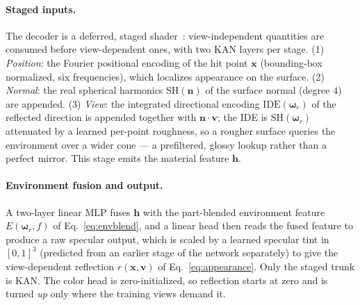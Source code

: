 \paragraph{Staged inputs.}
The decoder is a deferred, staged shader~\citep{refnerf}: view-independent quantities are consumed
before view-dependent ones, with two KAN layers per stage. (1) \emph{Position}: the Fourier
positional encoding of the hit point $\mathbf{x}$ (bounding-box normalized, six frequencies), which
localizes appearance on the surface. (2) \emph{Normal}: the real spherical harmonics
$\mathrm{SH}(\mathbf{n})$ of the surface normal (degree $4$) are appended. (3) \emph{View}: the
integrated directional encoding $\mathrm{IDE}(\boldsymbol{\omega}_r)$ of the reflected direction is
appended together with $\mathbf{n}\!\cdot\!\mathbf{v}$; the IDE is $\mathrm{SH}(\boldsymbol{\omega}_r)$
attenuated by a learned per-point roughness, so a rougher surface queries the environment over a
wider cone --- a prefiltered, glossy lookup rather than a perfect mirror. This stage emits the
material feature $\mathbf{h}$.

\paragraph{Environment fusion and output.}
A two-layer linear MLP fuses $\mathbf{h}$ with the part-blended environment feature
$E(\boldsymbol{\omega}_r,f)$ of Eq.~\eqref{eq:envblend}, and a linear head then reads the fused feature to produce a raw specular output, which is scaled by a learned specular tint in $[0,1]^3$ (predicted from an earlier stage of the network separately) to give the view-dependent reflection $r(\mathbf{x},\mathbf{v})$ of Eq.~\eqref{eq:appearance}. Only the staged trunk is KAN. The color head is zero-initialized, so reflection starts at
zero and is turned \emph{up} only where the training views demand it.
